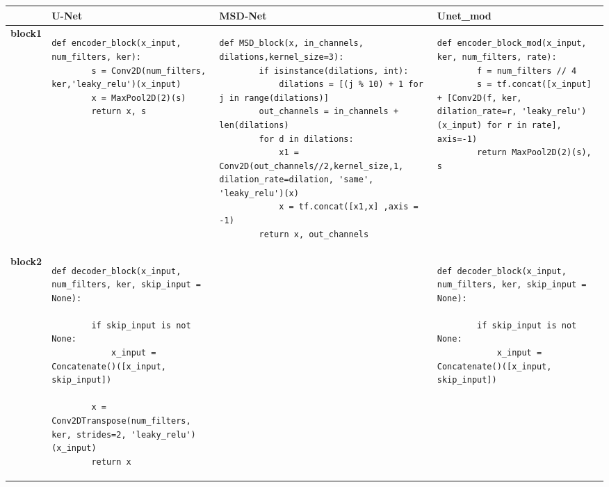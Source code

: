 \begin{table}[h!]
    \scriptsize
    \centering
    \begin{tabular}{|>{\centering\arraybackslash\bfseries}p{1.2cm}|p{4.5cm}|p{4.5cm}|p{4.5cm}|}
    \hline
     & \textbf{U-Net} & \textbf{MSD-Net} & \textbf{Unet\_mod} \\ \hline
    block1 & 
    \begin{lstlisting}[basicstyle=\tiny\ttfamily, xleftmargin=-1em]
    def encoder_block(x_input, num_filters, ker):
        s = Conv2D(num_filters, ker,'leaky_relu')(x_input)
        x = MaxPool2D(2)(s)
        return x, s
    \end{lstlisting} 
    & \begin{lstlisting}[basicstyle=\tiny\ttfamily, xleftmargin=-1em]
    def MSD_block(x, in_channels, dilations,kernel_size=3):  
        if isinstance(dilations, int):  
            dilations = [(j % 10) + 1 for j in range(dilations)]  
        out_channels = in_channels + len(dilations)  
        for d in dilations:  
            x1 = Conv2D(out_channels//2,kernel_size,1, dilation_rate=dilation, 'same', 'leaky_relu')(x)
            x = tf.concat([x1,x] ,axis = -1)
        return x, out_channels
    \end{lstlisting} 
    &
    \begin{lstlisting}[basicstyle=\tiny\ttfamily, xleftmargin=-1em]
    def encoder_block_mod(x_input, ker, num_filters, rate):
        f = num_filters // 4
        s = tf.concat([x_input] + [Conv2D(f, ker, dilation_rate=r, 'leaky_relu')(x_input) for r in rate], axis=-1)
        return MaxPool2D(2)(s), s
    \end{lstlisting} \\ \hline
    block2 
    &
    \begin{lstlisting}[basicstyle=\tiny\ttfamily, xleftmargin=-1em]
    def decoder_block(x_input, num_filters, ker, skip_input = None):
    
        if skip_input is not None:
            x_input = Concatenate()([x_input, skip_input])
            
        x = Conv2DTranspose(num_filters, ker, strides=2, 'leaky_relu')(x_input)
        return x
    \end{lstlisting} 
    & 
    &
    \begin{lstlisting}[basicstyle=\tiny\ttfamily, xleftmargin=-1em]
    def decoder_block(x_input, num_filters, ker, skip_input = None):
    
        if skip_input is not None:
            x_input = Concatenate()([x_input, skip_input])
            

\end{lstlisting}
\end{tabular}
\end{table}
